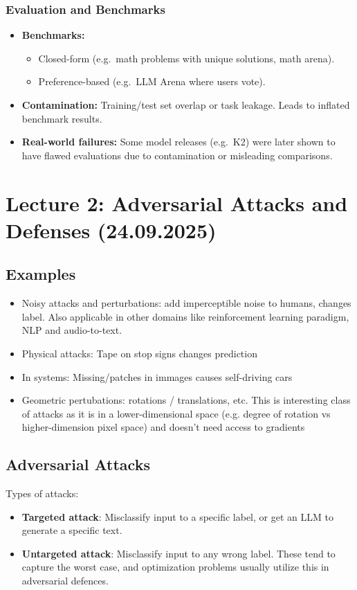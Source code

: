 \documentclass[11pt]{article}
\begin{document}
\subsubsection{Evaluation and Benchmarks}
\begin{itemize}
	\item \textbf{Benchmarks:}
	      \begin{itemize}
		      \item Closed-form (e.g.\ math problems with unique solutions, math arena).
		      \item Preference-based (e.g.\ LLM Arena where users vote).
	      \end{itemize}
	\item \textbf{Contamination:} Training/test set overlap or task leakage.  
	      Leads to inflated benchmark results.
	\item \textbf{Real-world failures:} Some model releases (e.g.\ K2) were later shown to have flawed evaluations due to contamination or misleading comparisons.
\end{itemize}
\newpage

\section{Lecture 2: Adversarial Attacks and Defenses (24.09.2025)} %
\subsection{Examples}
\begin{itemize}
	\item Noisy attacks and perturbations: add imperceptible noise to humans, changes label. Also applicable in other domains like reinforcement learning paradigm, NLP and audio-to-text.
	\item Physical attacks: Tape on stop signs changes prediction
	\item In systems: Missing/patches in immages causes self-driving cars
	\item Geometric pertubations: rotations / translations, etc. This is interesting class of attacks as it is in a lower-dimensional space (e.g. degree of rotation vs higher-dimension pixel space) and doesn't need access to gradients
\end{itemize}

\subsection{Adversarial Attacks}
Types of attacks:
\begin{itemize}
	\item \textbf{Targeted attack}: Misclassify input to a specific label, or get an LLM to generate a specific text. 
	\item \textbf{Untargeted attack}: Misclassify input to any wrong label. These tend to capture the worst case, and optimization problems usually utilize this in adversarial defences.
\end{itemize}
\end{document}
